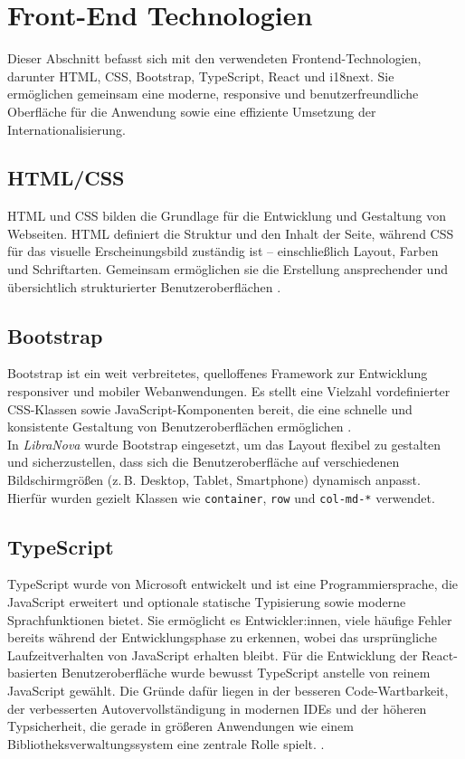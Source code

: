 \section{Front-End Technologien}
Dieser Abschnitt befasst sich mit den verwendeten Frontend-Technologien, darunter HTML, CSS, Bootstrap, TypeScript, React und i18next. Sie ermöglichen gemeinsam eine moderne, responsive und benutzerfreundliche Oberfläche für die Anwendung sowie eine effiziente Umsetzung der Internationalisierung.


\subsection{HTML/CSS}
HTML und CSS bilden die Grundlage für die Entwicklung und Gestaltung von Webseiten. HTML definiert die Struktur und den Inhalt der Seite, während CSS für das visuelle Erscheinungsbild zuständig ist – einschließlich Layout, Farben und Schriftarten. Gemeinsam ermöglichen sie die Erstellung ansprechender und übersichtlich strukturierter Benutzeroberflächen \cite{HTMLCSS2025a, HTMLCSS2025b}.

\subsection{Bootstrap}
Bootstrap ist ein weit verbreitetes, quelloffenes Framework zur Entwicklung responsiver und mobiler Webanwendungen. Es stellt eine Vielzahl vordefinierter CSS-Klassen sowie JavaScript-Komponenten bereit, die eine schnelle und konsistente Gestaltung von Benutzeroberflächen ermöglichen \cite{BOOTSTRAP2025}. \\
In \textit{LibraNova} wurde Bootstrap eingesetzt, um das Layout flexibel zu gestalten und sicherzustellen, dass sich die Benutzeroberfläche auf verschiedenen Bildschirmgrößen (z.\,B. Desktop, Tablet, Smartphone) dynamisch anpasst. Hierfür wurden gezielt Klassen wie \texttt{container}, \texttt{row} und \texttt{col-md-*} verwendet.

\subsection{TypeScript}
TypeScript wurde von Microsoft entwickelt und ist eine Programmiersprache, die JavaScript erweitert und optionale statische Typisierung sowie moderne Sprachfunktionen bietet. Sie ermöglicht es Entwickler:innen, viele häufige Fehler bereits während der Entwicklungsphase zu erkennen, wobei das ursprüngliche Laufzeitverhalten von JavaScript erhalten bleibt. Für die Entwicklung der React-basierten Benutzeroberfläche wurde bewusst TypeScript anstelle von reinem JavaScript gewählt. Die Gründe dafür liegen in der besseren Code-Wartbarkeit, der verbesserten Autovervollständigung in modernen IDEs und der höheren Typsicherheit, die gerade in größeren Anwendungen wie einem Bibliotheksverwaltungssystem eine zentrale Rolle spielt. \cite{MICROSOFT2025, TYPESCRIPT2025}.



